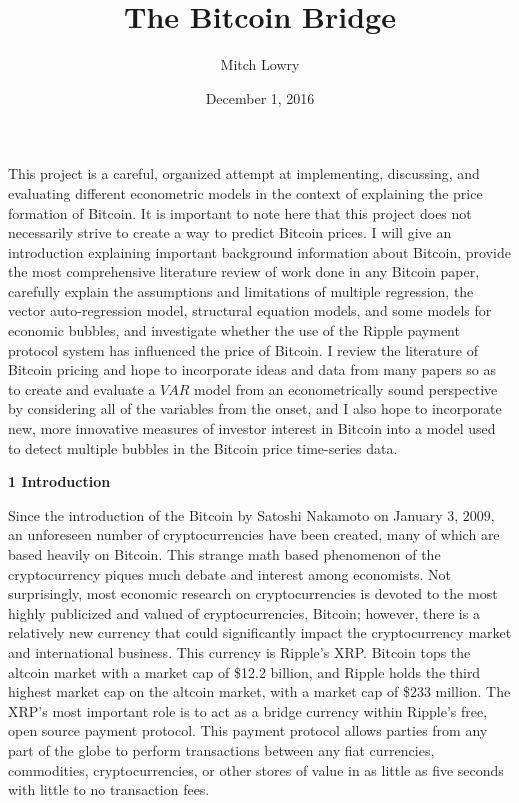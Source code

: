 \documentclass{article}[10 pt]
\title{The Bitcoin Bridge}
\date{December 1, 2016}
\author{Mitch Lowry}
\newcommand{\vs}{\vspace{0.1in}}
\begin{document}
\maketitle

This project is a careful, organized attempt at implementing, discussing,
and evaluating different econometric models in the context of explaining the
price formation of Bitcoin. It is important to note here that this project
does not necessarily strive to create a way to predict Bitcoin prices. I
will give an introduction explaining important background information about
Bitcoin, provide the most comprehensive literature review of work done in
any Bitcoin paper, carefully explain the assumptions and limitations of multiple 
regression, the vector auto-regression model, structural equation models, 
and some models for economic bubbles, and investigate whether the use of the 
Ripple payment protocol system has influenced the price of Bitcoin. I review
the literature of Bitcoin pricing and hope to incorporate ideas and data from many
papers so as to create and evaluate a $VAR$ model from an econometrically
sound perspective by considering all of the variables from the onset, and I
also hope to incorporate new, more innovative measures of investor interest
in Bitcoin into a model used to detect multiple bubbles in the Bitcoin price time-series data.

\vs

\textbf{1 Introduction}

\vs

Since the introduction of the Bitcoin by Satoshi Nakamoto on January $3$,
$2009$, an unforeseen number of cryptocurrencies have been created, many of
which are based heavily on Bitcoin. This strange math based phenomenon of
the cryptocurrency piques much debate and interest among economists. Not
surprisingly, most economic research on cryptocurrencies is devoted to the
most highly publicized and valued of cryptocurrencies, Bitcoin; however,
there is a relatively new currency that could significantly impact the
cryptocurrency market and international business. This currency is
Ripple's
XRP. Bitcoin tops the altcoin market with a market cap of \$12.2 billion,
and Ripple holds the third highest market cap on the altcoin market, with a
market cap of \$233 million. The XRP's most important role is to act as a bridge currency within
Ripple's free, open source payment protocol. This payment protocol allows
parties from any part of the globe to perform transactions between any fiat
currencies, commodities, cryptocurrencies, or other stores of value in as
little as five seconds with little to no transaction fees.
\end{document}
